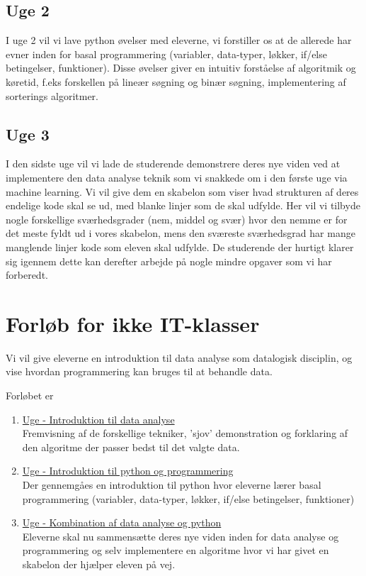 \documentclass[11pt]{article}
\begin{document}
    \subsection*{Uge 2}
        I uge 2 vil vi lave python øvelser med eleverne, vi forstiller os at de
        allerede har evner inden for basal programmering
        (variabler, data-typer, løkker, if/else betingelser, funktioner).
        Disse øvelser giver en intuitiv forståelse af algoritmik og køretid, f.eks
        forskellen på lineær søgning og binær søgning, implementering af
        sorterings algoritmer.

    \subsection{Uge 3}
        I den sidste uge vil vi lade de studerende demonstrere deres nye
        viden ved at implementere den data analyse teknik som vi snakkede
        om i den første uge via machine learning. Vi vil give dem en skabelon
        som viser hvad strukturen af deres endelige kode skal se ud, med
        blanke linjer som de skal udfylde. Her vil vi tilbyde nogle forskellige
        sværhedsgrader (nem, middel og svær) hvor den nemme er for det
        meste fyldt ud i vores skabelon, mens den sværeste sværhedsgrad
        har mange manglende linjer kode som eleven skal udfylde. De
        studerende der hurtigt klarer sig igennem dette kan derefter arbejde
        på nogle mindre opgaver som vi har forberedt.

\section{Forløb for ikke IT-klasser}
 	Vi vil give eleverne en introduktion til data analyse som datalogisk
	disciplin, og vise hvordan programmering kan bruges til at behandle
	data.

    	Forløbet er
    	\begin{enumerate}
        		\item \underline{Uge - Introduktion til data analyse} ~ \\
        		Fremvisning af de forskellige tekniker, 'sjov' demonstration
        		og forklaring af den algoritme der passer bedst til det
        		valgte data.

        		\item \underline{Uge - Introduktion til python og programmering} ~ \\
        		Der gennemgåes en introduktion til python hvor eleverne
        		lærer basal programmering
        		(variabler, data-typer, løkker, if/else betingelser, funktioner)

		\item \underline{Uge - Kombination af data analyse og python} ~ \\
        		Eleverne skal nu sammensætte deres nye viden inden for data
        		analyse og programmering og selv implementere en algoritme
        		hvor vi har givet en skabelon der hjælper eleven på vej.
    \end{enumerate}
\end{document}
